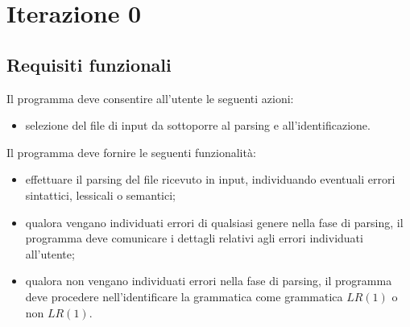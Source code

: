\documentclass[12pt]{article}
\begin{document}
\pagebreak

\section{Iterazione 0}

\subsection{Requisiti funzionali}
Il programma deve consentire all'utente le seguenti azioni:
\begin{itemize}
\item selezione del file di input da sottoporre al parsing e all'identificazione.
\end{itemize}
Il programma deve fornire le seguenti funzionalità:
\begin{itemize}
\item effettuare il parsing del file ricevuto in input, individuando eventuali errori sintattici, lessicali o semantici;
\item qualora vengano individuati errori di qualsiasi genere nella fase di parsing, il programma deve comunicare i dettagli relativi agli errori individuati all'utente;
\item qualora non vengano individuati errori nella fase di parsing, il programma deve procedere nell'identificare la grammatica come grammatica $LR \left( 1 \right)$ o non $LR \left( 1 \right)$.
\end{itemize}  
\end{document}
